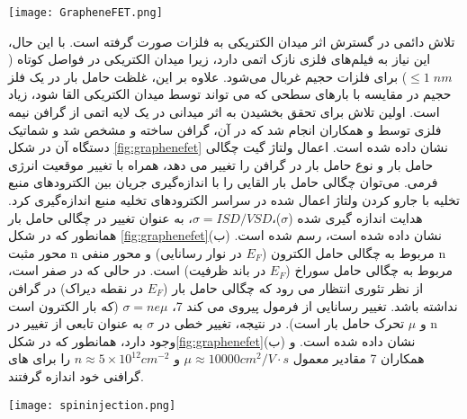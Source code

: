 \begin{figure*}[!ht]
    \centering
    \texttt{[image: GrapheneFET.png]}
    \caption{(الف). شماتیک دستگاه یک  با کانال گرافن بین الکترودهای منبع تخلیه و یک دروازه پشتی. (ب). طرحی از هدایت حامل بار ($\sigma$) گرافن  که تابعی از چگالی حامل بار  ترسیم شده است. نمودار درونی – نواری گرافن با انرژی فرمی، $E_F$.}
    \label{fig:graphenefet}
\end{figure*}
تلاش دائمی در گسترش اثر میدان الکتریکی به فلزات صورت گرفته است. با این حال، این نیاز به فیلم‌های فلزی نازک اتمی دارد، زیرا میدان الکتریکی در فواصل کوتاه ($\le 1\;nm$) برای فلزات حجیم غربال می‌شود. علاوه بر این، غلظت حامل بار در یک فلز حجیم در مقایسه با بارهای سطحی که می تواند توسط میدان الکتریکی القا شود، زیاد است. اولین تلاش برای تحقق بخشیدن به اثر میدانی در یک لایه اتمی از گرافن نیمه فلزی توسط  و همکاران انجام شد که در آن،  گرافن ساخته و مشخص شد و شماتیک دستگاه آن در شکل \ref{fig:graphenefet} نشان داده شده است. اعمال ولتاژ گیت  چگالی حامل بار  و نوع حامل بار در گرافن را تغییر می دهد، همراه با تغییر موقعیت انرژی فرمی. می‌توان چگالی حامل بار القایی را با اندازه‌گیری جریان  بین الکترودهای منبع تخلیه با جارو کردن ولتاژ  اعمال شده در سراسر الکترودهای تخلیه منبع اندازه‌گیری کرد. هدایت اندازه گیری شده ($\sigma$)،$\sigma = ISD/VSD$، به عنوان تغییر در چگالی حامل بار همانطور که در شکل \ref{fig:graphenefet}(ب) نشان داده شده است، رسم شده است. محور مثبت n مربوط به چگالی حامل الکترون ($E_F$ در نوار رسانایی) و محور منفی n مربوط به چگالی حامل سوراخ ($E_F$ در باند ظرفیت) است. در حالی که در صفر است، از نظر تئوری انتظار می رود که چگالی حامل بار ($E_F$ در نقطه دیراک) در گرافن نداشته باشد. تغییر رسانایی از فرمول  پیروی می کند 7، $\sigma = ne\mu$ (که  بار الکترون است و $\mu$ تحرک حامل بار است). در نتیجه، تغییر خطی در $\sigma$ به عنوان تابعی از تغییر در n وجود دارد، همانطور که در شکل\ref{fig:graphenefet}(ب) نشان داده شده است.  و همکاران 7 مقادیر معمول $\mu \approx 10000 cm^2/V·s$ و $n \approx 5 \times 10^{12} cm^{-2}$ را برای  های گرافنی خود اندازه گرفتند.
\begin{figure*}[!ht]
    \centering
    \texttt{[image: spininjection.png]}
    \caption{تزریق اسپین از یک فرومغناطیس  به یک غیر آهنربا  همانطور که در قسمت سمت چپ شکل نشان داده شده است. پتانسیل شیمیایی اسپین در ، رابط )بین  و (، و بخش عمده  در مرکز نشان داده شده است. فروپاشی نمایی انباشت اسپین القایی از رابط به بخش عمده  در قسمت سمت راست شکل نشان داده شده است.}
    \label{fig:spininjection}
\end{figure*}
